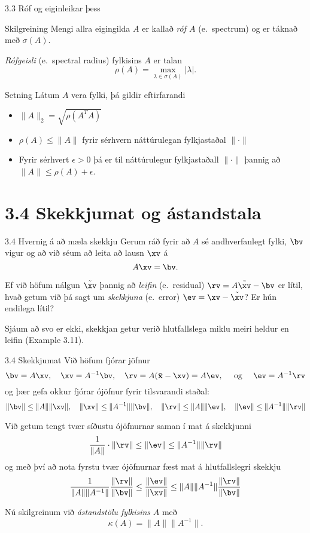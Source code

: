 \begin{frame}{3.3 Róf og eiginleikar þess}
\begin{block}{Skilgreining}
Mengi allra eigingilda $A$ er kallað \emph{róf $A$} (e.~spectrum) og er táknað með $\sigma(A)$.
\pause

\emph{Rófgeisli} (e.~spectral radius) fylkisins $A$ er talan
$$
\rho(A) = \max_{\lambda \in \sigma(A)} |\lambda|.
$$
\end{block}


\begin{block}{Setning}
Látum $A$ vera fylki, þá gildir eftirfarandi \pause
 \begin{itemize}
  \item $\|A\|_2 = \sqrt{\rho(A^T A)}$\pause
  \item $\rho(A) \leq \|A\|$ fyrir sérhvern náttúrulegan fylkjastaðal $\|\cdot\|$\pause
  \item Fyrir sérhvert $\epsilon >0$ þá er til náttúrulegur fylkjastaðall $\|\cdot\|$ þannig
að $\|A\| \leq \rho(A) + \epsilon$.
 \end{itemize}

\end{block} 
\end{frame}

\section*{3.4 Skekkjumat og ástandstala}
\begin{frame}{3.4 Hvernig á að mæla skekkju}
 Gerum ráð fyrir að $A$ sé andhverfanlegt fylki, $\bv$ vigur og að við séum að
leita að lausn $\xv$ á 
$$
A\xv = \bv.
$$
\pause
\medskip

Ef við höfum nálgun $\tilde \xv$ þannig að \emph{leifin} (e.~residual) $\rv = A\tilde \xv - \bv$ er lítil, hvað 
getum við þá sagt um \emph{skekkjuna} (e.~error) $\ev = \xv -\tilde \xv$? Er hún endilega lítil?

\pause
\medskip

Sjáum að svo er ekki, skekkjan getur verið hlutfallslega miklu meiri heldur en leifin
(Example 3.11).


\end{frame}

\begin{frame}{3.4 Skekkjumat}
Við höfum fjórar jöfnur
$$
\bv=A\xv, \quad \xv=A^{-1}\bv, \quad 
\rv=A(\mathbf{\tilde x}-\xv)=A\ev, \quad \text{ og } \quad
\ev=A^{-1}\rv
$$\pause
og þær gefa okkur fjórar ójöfnur fyrir tilsvarandi staðal:
$$
\|\bv\|\leq \|A\|\|\xv\|, \quad  \|\xv\|\leq \|A^{-1}\|\|\bv\|, 
\quad  
\|\rv\|\leq \|A\|\|\ev\|, \quad  \|\ev\|\leq \|A^{-1}\|\|\rv\|
$$

\pause
\smallskip
Við getum tengt tvær síðustu ójöfnurnar saman í mat á skekkjunni
$$
\dfrac 1{\|A\|}\cdot  \|\rv\|
\leq  \|\ev\| \leq 
\|A^{-1}\| \|\rv\|
$$\pause
og með því að nota fyrstu tvær ójöfnurnar fæst mat á hlutfallslegri skekkju
$$
\dfrac 1{\|A\|\|A^{-1}\|}\dfrac{ \|\rv\|}{\|\bv\|} 
\leq \dfrac{\|\ev\|}{\|\xv\|} \leq 
\|A\|\|A^{-1}\|\dfrac{\|\rv\|}{\|\bv\|}
$$

\pause
\smallskip
Nú skilgreinum við {\it ástandstölu fylkisins} $A$ með
$$
\kappa(A)=\|A\|\|A^{-1}\|.
$$
\end{frame}


